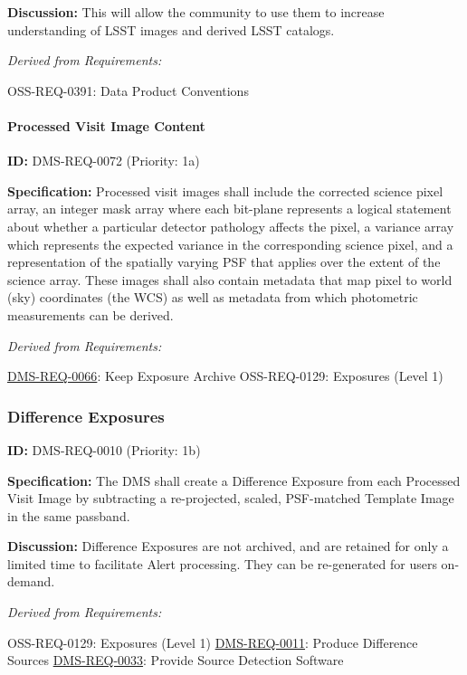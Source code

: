 \documentclass[SE,toc,lsstdraft]{lsstdoc}
\begin{document}
\textbf{Discussion:} This will allow the community to use them to increase understanding of LSST images and derived LSST catalogs.

\emph{Derived from Requirements:}

OSS-REQ-0391:
Data Product Conventions \newline

\paragraph{Processed Visit Image Content}\hfill  %

\label{DMS-REQ-0072}
\textbf{ID:} DMS-REQ-0072 (Priority: 1a)

\textbf{Specification:} Processed visit images shall include the corrected science pixel array, an integer mask array where each bit-plane represents a logical statement about whether a particular detector pathology affects the pixel, a variance array which represents the expected variance in the corresponding science pixel, and a representation of the spatially varying PSF that applies over the extent of the science array. These images shall also contain metadata that map pixel to world (sky) coordinates (the WCS) as well as metadata from which photometric measurements can be derived.

\emph{Derived from Requirements:}

\hyperref[DMS-REQ-0066]{DMS-REQ-0066}:
Keep Exposure Archive \newline
OSS-REQ-0129:
Exposures (Level 1) \newline

\subsubsection{Difference Exposures}

\label{DMS-REQ-0010}
\textbf{ID:} DMS-REQ-0010 (Priority: 1b)

\textbf{Specification:} The DMS shall create a Difference Exposure from each Processed Visit Image by subtracting a re-projected, scaled, PSF-matched Template Image in the same passband.

\textbf{Discussion:} Difference Exposures are not archived, and are retained for only a limited time to facilitate Alert processing. They can be re-generated for users on-demand.

\emph{Derived from Requirements:}

OSS-REQ-0129:
Exposures (Level 1) \newline
\hyperref[DMS-REQ-0011]{DMS-REQ-0011}:
Produce Difference Sources \newline
\hyperref[DMS-REQ-0033]{DMS-REQ-0033}:
Provide Source Detection Software \newline
\end{document}
